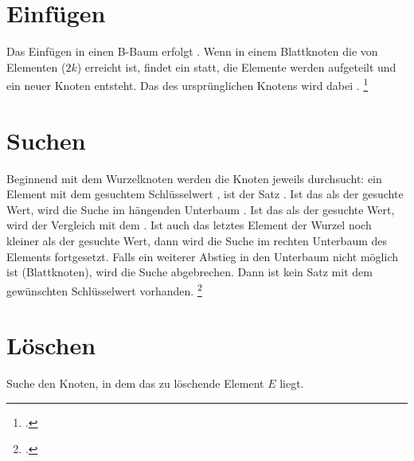 \documentclass{lehramt-informatik-haupt}
\begin{document}
%

\section{Einfügen}

Das Einfügen in einen B-Baum erfolgt .
Wenn in einem Blattknoten die  von Elementen
($2k$) erreicht ist, findet ein  statt, \dh die
Elemente werden aufgeteilt und ein neuer Knoten entsteht. Das
 des ursprünglichen Knotens wird dabei .
\footcite[Seite 32]{aud:fs:5}

%

\section{Suchen}

Beginnend mit dem Wurzelknoten werden die Knoten jeweils  durchsucht:
%
 ein Element mit dem gesuchtem Schlüsselwert
, ist der Satz .
%
Ist das  als der gesuchte Wert, wird die
Suche im  hängenden Unterbaum .
%
Ist das  als der gesuchte Wert, wird der
Vergleich mit dem .
%
Ist auch das letztes Element der Wurzel noch kleiner als der
gesuchte Wert, dann wird die Suche im rechten Unterbaum des Elements
fortgesetzt.
%
Falls ein weiterer Abstieg in den Unterbaum nicht möglich ist
(\dh Blattknoten), wird die Suche abgebrechen. Dann ist kein Satz mit
dem gewünschten Schlüsselwert vorhanden.
\footcite[Seite 37 (PDF 31)]{aud:fs:5}

%

\section{Löschen}

Suche den Knoten, in dem das zu löschende Element $E$ liegt.
\end{document}
